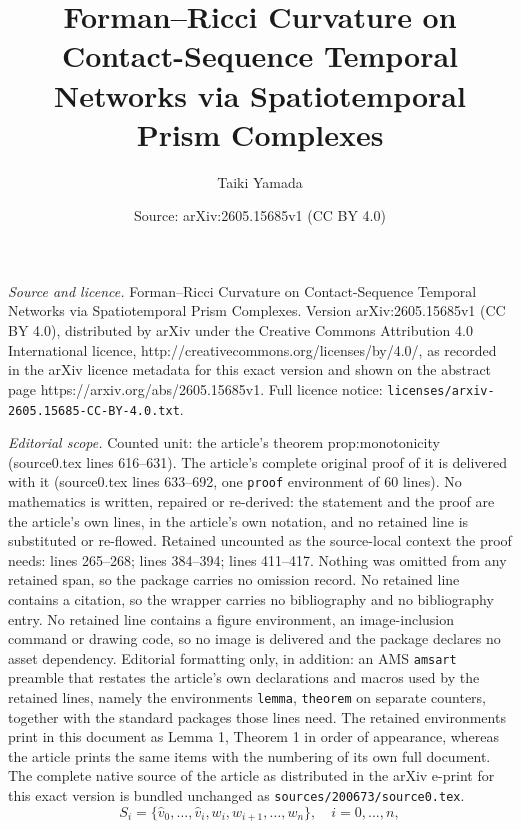 \documentclass[10pt,a4paper]{amsart}
\title{Forman--Ricci Curvature on Contact-Sequence Temporal Networks via Spatiotemporal Prism Complexes}
\author{Taiki Yamada}
\date{Source: arXiv:2605.15685v1 (CC BY 4.0)}
\begin{document}
\maketitle

\noindent\emph{Source and licence.} Forman--Ricci Curvature on Contact-Sequence Temporal Networks via Spatiotemporal Prism Complexes. Version arXiv:2605.15685v1 (CC BY 4.0), distributed by arXiv under the Creative Commons Attribution 4.0 International licence, http://creativecommons.org/licenses/by/4.0/, as recorded in the arXiv licence metadata for this exact version and shown on the abstract page https://arxiv.org/abs/2605.15685v1. Full licence notice: \texttt{licenses/arxiv-2605.15685-CC-BY-4.0.txt}.\par\smallskip

\noindent\textit{Editorial scope.} Counted unit: the article's theorem prop:monotonicity (source0.tex lines 616--631). The article's complete original proof of it is delivered with it (source0.tex lines 633--692, one \texttt{proof} environment of 60 lines). No mathematics is written, repaired or re-derived: the statement and the proof are the article's own lines, in the article's own notation, and no retained line is substituted or re-flowed.  Retained uncounted as the source-local context the proof needs: lines 265--268; lines 384--394; lines 411--417.  Nothing was omitted from any retained span, so the package carries no omission record.  No retained line contains a citation, so the wrapper carries no bibliography and no bibliography entry.  No retained line contains a figure environment, an image-inclusion command or drawing code, so no image is delivered and the package declares no asset dependency.  Editorial formatting only, in addition: an AMS \texttt{amsart} preamble that restates the article's own declarations and macros used by the retained lines, namely the environments \texttt{lemma}, \texttt{theorem} on separate counters, together with the standard packages those lines need.  The retained environments print in this document as Lemma 1, Theorem 1 in order of appearance, whereas the article prints the same items with the numbering of its own full document.  The complete native source of the article as distributed in the arXiv e-print for this exact version is bundled unchanged as \texttt{sources/200673/source0.tex}.
\begin{equation}\label{eq:prism}
    S_i = \{\hat v_0,\dots,\hat v_i,w_i,w_{i+1},\dots,w_n\},
    \quad i=0,\dots,n,
\end{equation}
\end{document}
